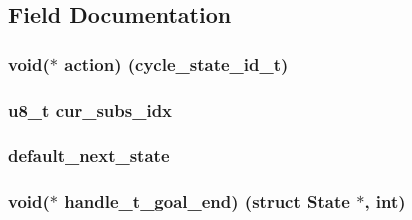 \subsection{Field Documentation}
\subsubsection[{\texorpdfstring{action}{action}}]{\setlength{\rightskip}{0pt plus 5cm}void($\ast$ action) ({\bf cycle\+\_\+state\+\_\+id\+\_\+t})}\hypertarget{struct_state_a55d5000db1bebc1ee6f6d6d5b3bb6673}{}\label{struct_state_a55d5000db1bebc1ee6f6d6d5b3bb6673}
\subsubsection[{\texorpdfstring{cur\+\_\+subs\+\_\+idx}{cur_subs_idx}}]{\setlength{\rightskip}{0pt plus 5cm}u8\+\_\+t cur\+\_\+subs\+\_\+idx}\hypertarget{struct_state_a06b41367cc51f722ce294c92dc341e93}{}\label{struct_state_a06b41367cc51f722ce294c92dc341e93}
\subsubsection[{\texorpdfstring{default\+\_\+next\+\_\+state}{default_next_state}}]{ default\+\_\+next\+\_\+state}\hypertarget{struct_state_af9d8ee1d5b2527603692e4e16a510dfc}{}\label{struct_state_af9d8ee1d5b2527603692e4e16a510dfc}
\subsubsection[{\texorpdfstring{handle\+\_\+t\+\_\+goal\+\_\+end}{handle_t_goal_end}}]{\setlength{\rightskip}{0pt plus 5cm}void($\ast$ handle\+\_\+t\+\_\+goal\+\_\+end) (struct {\bf State} $\ast$, int)}\hypertarget{struct_state_ab347ebabf77bbde522554a8d663ec4a5}{}\label{struct_state_ab347ebabf77bbde522554a8d663ec4a5}
